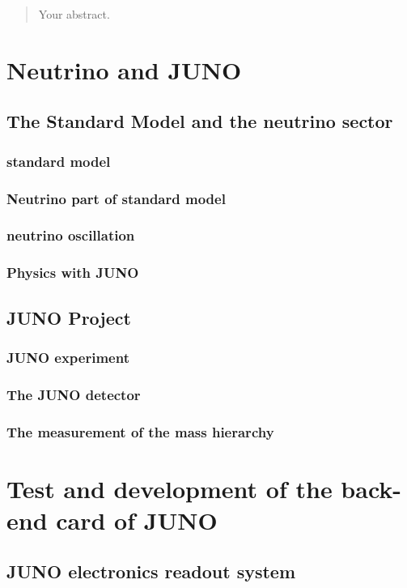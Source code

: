 \documentclass[a4paper,english,12pt]{memoir}
\begin{document}

\tableofcontents*
\newpage

\begin{abstract}
Your abstract.
\end{abstract}
\frontmatter
\mainmatter
\part{Neutrino and JUNO}

\chapter{The Standard Model and the neutrino sector}
\section{standard model}
\section{Neutrino part of standard model}
\section{neutrino oscillation}
\section{Physics with JUNO}
\chapter{JUNO Project}
\section{JUNO experiment}
\section{The JUNO detector}
\section{The measurement of the mass hierarchy}
\part{Test and development of the back-end card of JUNO}
\chapter{JUNO electronics readout system}
\end{document}
